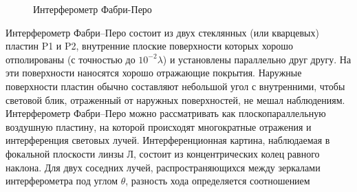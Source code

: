 \documentclass[a4paper,12pt]{article}
\begin{document}
\FloatBarrier
\begin{figure}[!h]
	\begin{minipage}[h]{0.55\linewidth}
	\end{minipage}
	\begin{minipage}[h]{0.5\linewidth}
	\end{minipage}
  \caption[]{\label{fig:ifp} Интерферометр Фабри-Перо}
\end{figure}
\FloatBarrier

Интерферометр Фабри–Перо состоит из двух стеклянных (или кварцевых) пластин P1 и P2,
внутренние плоские поверхности которых
хорошо отполированы (с точностью до $10^{-2}\lambda$) и установлены параллельно друг
другу. На эти поверхности наносятся хорошо отражающие покрытия. Наружные поверхности
пластин обычно составляют небольшой угол с внутренними, чтобы световой блик,
отраженный от наружных поверхностей, не мешал наблюдениям. Интерферометр Фабри–Перо можно
рассматривать как плоскопараллельную воздушную пластину, на которой происходят
многократные отражения и интерференция световых лучей. Интерференционная картина,
наблюдаемая в фокальной плоскости линзы Л, состоит из концентрических колец равного
наклона. Для двух соседних лучей, распространяющихся между зеркалами интерферометра
под углом $\theta$, разность хода определяется соотношением
\end{document}
